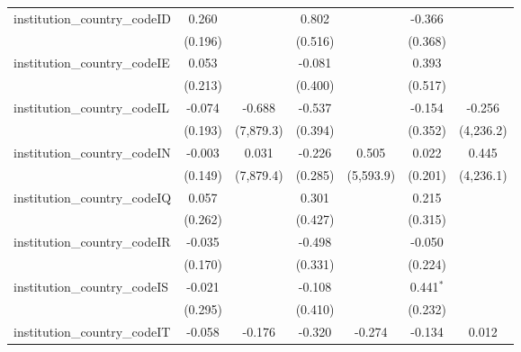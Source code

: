 \begin{tabular}{lcccccc}
   institution\_country\_codeID          & 0.260          &               & 0.802          &               & -0.366         &   \\   
                                         & (0.196)        &               & (0.516)        &               & (0.368)        &   \\   
   institution\_country\_codeIE          & 0.053          &               & -0.081         &               & 0.393          &   \\   
                                         & (0.213)        &               & (0.400)        &               & (0.517)        &   \\   
   institution\_country\_codeIL          & -0.074         & -0.688        & -0.537         &               & -0.154         & -0.256\\   
                                         & (0.193)        & (7,879.3)     & (0.394)        &               & (0.352)        & (4,236.2)\\   
   institution\_country\_codeIN          & -0.003         & 0.031         & -0.226         & 0.505         & 0.022          & 0.445\\   
                                         & (0.149)        & (7,879.4)     & (0.285)        & (5,593.9)     & (0.201)        & (4,236.1)\\   
   institution\_country\_codeIQ          & 0.057          &               & 0.301          &               & 0.215          &   \\   
                                         & (0.262)        &               & (0.427)        &               & (0.315)        &   \\   
   institution\_country\_codeIR          & -0.035         &               & -0.498         &               & -0.050         &   \\   
                                         & (0.170)        &               & (0.331)        &               & (0.224)        &   \\   
   institution\_country\_codeIS          & -0.021         &               & -0.108         &               & 0.441$^{*}$    &   \\   
                                         & (0.295)        &               & (0.410)        &               & (0.232)        &   \\   
   institution\_country\_codeIT          & -0.058         & -0.176        & -0.320         & -0.274        & -0.134         & 0.012\\   

\end{tabular}
